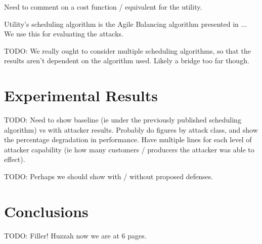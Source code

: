 \documentclass[conference]{IEEEtran}
\begin{document}
Need to comment on a cost function / equivalent for the utility.

Utility's scheduling algorithm is the Agile Balancing algorithm presented in ... We use this for evaluating the attacks.

TODO:  We really ought to consider multiple scheduling algorithms, so that the results aren't dependent on the algorithm 
used.  Likely a bridge too far though.

\section{Experimental Results}
\label{Experimental Results}

TODO: Need to show baseline (ie under the previously published scheduling algorithm) vs with attacker results.  Probably
do figures by attack class, and show the percentage degradation in performance.  Have multiple lines for each level of attacker
capability (ie how many customers / producers the attacker was able to effect).

TODO: Perhaps we should show with / without proposed defenses.


\section{Conclusions}
\label{Conclusions}

TODO:  Filler!  Huzzah now we are at 6 pages.



\end{document}
